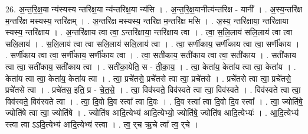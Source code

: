 \documentclass[17pt]{extarticle}
\begin{document}
26. अ॒न्त॒रि॒क्ष॒या न्य॑स्यस्य न्तरिक्ष॒या न्य॑न्तरिक्ष॒या न्य॑सि । . अ॒न्त॒रि॒क्ष॒यानीत्य॑न्तरिक्ष - यानी᳚ । . अ॒स्य॒न्तरि॑क्ष म॒न्तरि॑क्ष मस्यस्य॒ न्तरि॑क्षम् । . अ॒न्तरि॑क्ष मस्यस्य॒ न्तरि॑क्ष म॒न्तरि॑क्ष मसि । . अ॒स्य॒ न्तरि॑क्षाया॒ न्तरि॑क्षाया स्यस्य॒ न्तरि॑क्षाय । . अ॒न्तरि॑क्षाय त्वा त्वा॒ ऽन्तरि॑क्षाया॒ न्तरि॑क्षाय त्वा । . त्वा॒ स॒लि॒लाय॑ सलि॒लाय॑ त्वा त्वा सलि॒लाय॑ । . स॒लि॒लाय॑ त्वा त्वा सलि॒लाय॑ सलि॒लाय॑ त्वा । . त्वा॒ सर्णी॑काय॒ सर्णी॑काय त्वा त्वा॒ सर्णी॑काय । . सर्णी॑काय त्वा त्वा॒ सर्णी॑काय॒ सर्णी॑काय त्वा । . त्वा॒ सती॑काय॒ सती॑काय त्वा त्वा॒ सती॑काय । . सती॑काय त्वा त्वा॒ सती॑काय॒ सती॑काय त्वा । . सती॑का॒येति॒ स - ती॒का॒य॒ । . त्वा॒ केता॑य॒ केता॑य त्वा त्वा॒ केता॑य । . केता॑य त्वा त्वा॒ केता॑य॒ केता॑य त्वा । . त्वा॒ प्रचे॑तसे॒ प्रचे॑तसे त्वा त्वा॒ प्रचे॑तसे । . प्रचे॑तसे त्वा त्वा॒ प्रचे॑तसे॒ प्रचे॑तसे त्वा । . प्रचे॑तस॒ इति॒ प्र - चे॒त॒से॒ । . त्वा॒ विव॑स्वते॒ विव॑स्वते त्वा त्वा॒ विव॑स्वते । . विव॑स्वते त्वा त्वा॒ विव॑स्वते॒ विव॑स्वते त्वा । . त्वा॒ दि॒वो दि॒व स्त्वा᳚ त्वा दि॒वः । . दि॒व स्त्वा᳚ त्वा दि॒वो दि॒व स्त्वा᳚ । . त्वा॒ ज्योति॑षे॒ ज्योति॑षे त्वा त्वा॒ ज्योति॑षे । . ज्योति॑ष आदि॒त्येभ्य॑ आदि॒त्येभ्यो॒ ज्योति॑षे॒ ज्योति॑ष आदि॒त्येभ्यः॑ । . आ॒दि॒त्येभ्य॑ स्त्वा त्वा ऽऽदि॒त्येभ्य॑ आदि॒त्येभ्य॑ स्त्वा । . त्व॒ र्‌च ऋ॒चे त्वा᳚ त्व॒ र्‌चे । \newline
\end{document}
